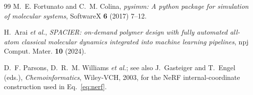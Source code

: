 \documentclass[11pt,a4paper]{article}
\begin{document}
\begin{thebibliography}{99}
M.~E. Fortunato and C.~M. Colina,
\emph{pysimm: A python package for simulation of molecular systems},
SoftwareX \textbf{6} (2017) 7--12.

H.~Arai \emph{et al.},
\emph{SPACIER: on-demand polymer design with fully automated all-atom
classical molecular dynamics integrated into machine learning pipelines},
npj Comput. Mater. \textbf{10} (2024).

D.~F. Parsons, D.~R.~M. Williams \emph{et al.};
see also J.~Gasteiger and T.~Engel (eds.),
\emph{Chemoinformatics}, Wiley-VCH, 2003, for the NeRF internal-coordinate
construction used in Eq.~\eqref{eq:nerf}.

\end{thebibliography}
\end{document}
